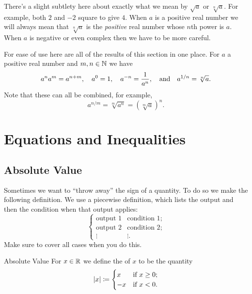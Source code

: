 \documentclass[fleqn]{LectureClass/LectureClass}
\begin{document}
    \begin{remark}{}{}
        There's a slight subtlety here about exactly what we mean by \(\sqrt{a}\) or \(\sqrt[n]{a}\).
        For example, both \(2\) and \(-2\) square to give \(4\).
        When \(a\) is a positive real number we will always mean that \(\sqrt[n]{a}\) is the \emph{positive} real number whose \(n\)th power is \(a\).
        When \(a\) is negative or even complex then we have to be more careful.
    \end{remark}
    
    For ease of use here are all of the results of this section in one place.
    For \(a\) a positive real number and \(m, n \in \mathbb{N}\) we have
    \begin{equation}
        a^na^m = a^{n + m}, \quad a^0 = 1, \quad a^{-n} = \frac{1}{a^n}, \quad\text{and}\quad a^{1/n} = \sqrt[n]{a}.
    \end{equation}
    Note that these can all be combined, for example,
    \begin{equation}
        a^{n/m} = \sqrt[m]{a^n} = (\sqrt[m]{a})^n.
    \end{equation}
    
    \chapter{Equations and Inequalities}
    \section{Absolute Value}
    Sometimes we want to \enquote{throw away} the sign of a quantity.
    To do so we make the following definition.
    We use a piecewise definition, which lists the output and then the condition when that output applies:
    \begin{equation}
        \begin{cases}
            \text{output 1} & \text{condition 1};\\
            \text{output 2} & \text{condition 2};\\
            \vdots & \vdots.
        \end{cases}
    \end{equation}
    Make sure to cover all cases when you do this.
    
    \begin{dfn}{Absolute Value}{}
        For \(x \in \mathbb{R}\) we define the  of \(x\) to be the quantity
        \begin{equation}
            \lvert x\rvert \coloneq 
            \begin{cases}
                x & \text{if } x \ge 0;\\
                -x & \text{if } x < 0.
            \end{cases}
        \end{equation}
    \end{dfn}
    
\end{document}

